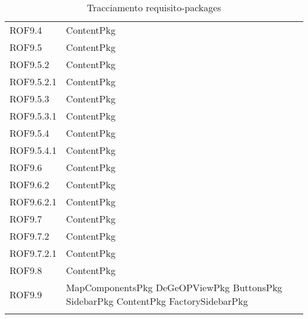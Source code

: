\begin{longtable}{p{2.5cm}!{\VRule[1pt]}p{5cm}}
		ROF9.4 & ContentPkg\\
		ROF9.5 & ContentPkg\\
		ROF9.5.2 & ContentPkg\\
		ROF9.5.2.1 & ContentPkg\\
		ROF9.5.3 & ContentPkg\\
		ROF9.5.3.1 & ContentPkg\\
		ROF9.5.4 & ContentPkg\\
		ROF9.5.4.1 & ContentPkg\\
		ROF9.6 & ContentPkg\\
		ROF9.6.2 & ContentPkg\\
		ROF9.6.2.1 & ContentPkg\\
		ROF9.7 & ContentPkg\\
		ROF9.7.2 & ContentPkg\\
		ROF9.7.2.1 & ContentPkg\\
		ROF9.8 & ContentPkg\\
		ROF9.9 & MapComponentsPkg \newline DeGeOPViewPkg \newline ButtonsPkg \newline SidebarPkg \newline ContentPkg \newline FactorySidebarPkg\\
		\caption{Tracciamento requisito-packages}
	\end{longtable}
	
	\newpage
	
